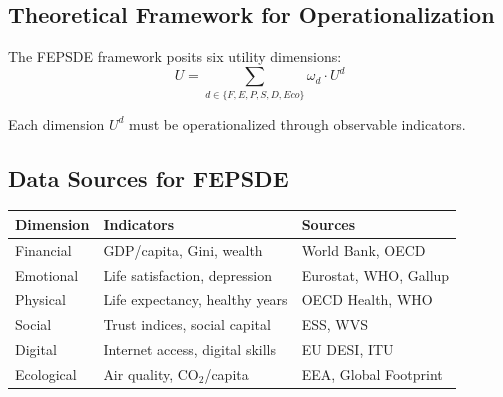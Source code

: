 

\subsection{Theoretical Framework for Operationalization}
\label{sec:E-theory}

The FEPSDE framework posits six utility dimensions:
\begin{equation}
U = \sum_{d \in \{F,E,P,S,D,Eco\}} \omega_d \cdot U^d
\tag{E-Utility}
\end{equation}

Each dimension $U^d$ must be operationalized through observable indicators.


\subsection{Data Sources for FEPSDE}

\begin{center}
\renewcommand{\arraystretch}{1.2}
\begin{tabular}{lll}
\hline
\textbf{Dimension} & \textbf{Indicators} & \textbf{Sources} \\
\hline
Financial & GDP/capita, Gini, wealth & World Bank, OECD \\
Emotional & Life satisfaction, depression & Eurostat, WHO, Gallup \\
Physical & Life expectancy, healthy years & OECD Health, WHO \\
Social & Trust indices, social capital & ESS, WVS \\
Digital & Internet access, digital skills & EU DESI, ITU \\
Ecological & Air quality, CO$_2$/capita & EEA, Global Footprint \\
\hline
\end{tabular}
\end{center}

